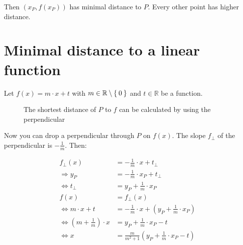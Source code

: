 \documentclass[a4paper]{scrartcl}
\def\mdr{\ensuremath{\mathbb{R}}}
\begin{document}
Then $(x_P,f(x_P))$ has
minimal distance to $P$. Every other point has higher distance.

\section{Minimal distance to a linear function}
Let $f(x) = m \cdot x + t$ with $m \in \mdr \setminus \Set{0}$ and 
$t \in \mdr$ be a function.

\begin{figure}[htp]
    \centering
    \caption{The shortest distance of $P$ to $f$ can be calculated by using the perpendicular}
\end{figure}

Now you can drop a perpendicular through $P$ on $f(x)$. The slope $f_\bot$
of the perpendicular is $- \frac{1}{m}$. Then:

\begin{align}
                 f_\bot(x) &= - \frac{1}{m} \cdot x + t_\bot\\
    \Rightarrow        y_P &= - \frac{1}{m} \cdot x_P + t_\bot\\
    \Leftrightarrow t_\bot &= y_P + \frac{1}{m} \cdot x_P\\
    f(x) &= f_\bot(x)\\
    \Leftrightarrow m \cdot x + t &= - \frac{1}{m} \cdot x + \left(y_P + \frac{1}{m} \cdot x_P \right)\\
    \Leftrightarrow \left (m + \frac{1}{m} \right ) \cdot x &= y_P + \frac{1}{m} \cdot x_P - t\\
    \Leftrightarrow x &= \frac{m}{m^2+1} \left ( y_P + \frac{1}{m} \cdot x_P - t \right )
\end{align}
\end{document}

